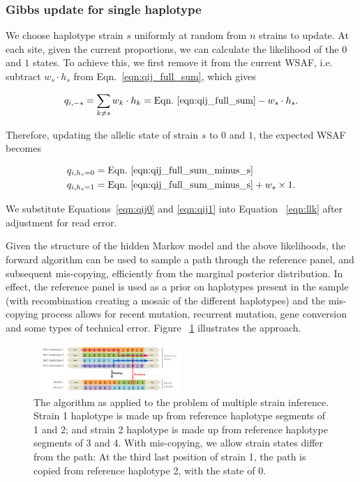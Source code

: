 \documentclass{bioinfo}
\begin{document}
\subsubsection{Gibbs update for single haplotype}

We choose haplotype strain $s$ uniformly at random from $n$ strains to update.  At each site, given the current proportions, we can calculate the likelihood of the $0$ and $1$ states.  To achieve this, we first remove it from the current WSAF, i.e. subtract $ w_s \cdot h_s$ from Eqn.~\eqref{eqn:qij_full_sum}, which gives

\begin{equation}
q_{i,-s} = \sum_{k\neq s} w_k \cdot h_k = \textrm{Eqn.~\eqref{eqn:qij_full_sum}} -  w_s \cdot h_s. \label{eqn:qij_full_sum_minus_s}
\end{equation}

\noindent Therefore, updating the allelic state of strain $s$ to $0$ and $1$, the expected WSAF becomes

\begin{align}
q_{i,h_s=0} & = \textrm{Eqn.~\eqref{eqn:qij_full_sum_minus_s}} \label{eqn:qij0}\\
q_{i,h_s=1} & = \textrm{Eqn.~\eqref{eqn:qij_full_sum_minus_s}} + w_s \times 1. \label{eqn:qij1}
\end{align}

\noindent We substitute Equations~\eqref{eqn:qij0} and \eqref{eqn:qij1} into Equation ~\eqref{eqn:llk} after adjustment for read error.

Given the structure of the hidden Markov model and the above likelihoods, the forward algorithm can be used to sample a path through the reference panel, and subsequent mis-copying, efficiently from the marginal posterior distribution.  In effect, the reference panel is used as a prior on haplotypes present in the sample (with recombination creating a mosaic of the different haplotypes) and the mis-copying process allows for recent mutation, recurrent mutation, gene conversion and some types of technical error.  Figure ~\ref{fig:ls} illustrates the approach.


\begin{figure}[tbh]
\centering
\includegraphics[width=0.5\textwidth]{Fig1.pdf}
\caption{The \citet{Li2003} algorithm as applied to the problem of multiple strain inference. Strain 1 haplotype is made up from reference haplotype segments of 1 and 2; and strain 2 haplotype is made up from reference haplotype segments of 3 and 4. With mis-copying, we allow strain states differ from the path: At the third last position of strain 1, the path is copied from reference haplotype 2, with the state of 0.}
\label{fig:ls}
\end{figure}
\end{document}
